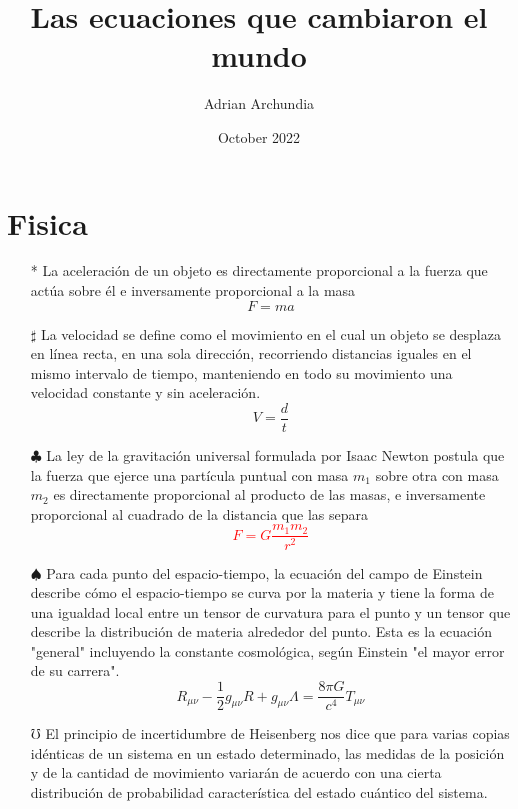\documentclass[4apaper, 12pt]{article}
\title{Las ecuaciones que cambiaron el mundo}
\author{Adrian Archundia }
\date{October 2022}
\begin{document}
\maketitle

\section{Fisica}
\begin{itemize}
    \item [*] La aceleración de un objeto es directamente proporcional a la fuerza que actúa sobre él e inversamente proporcional a la masa
    \begin{equation*}
        F=ma
    \end{equation*}
    \item[$\sharp$]La velocidad se define como el movimiento en el cual un objeto se desplaza en línea recta, en una sola dirección, recorriendo distancias iguales en el mismo intervalo de tiempo, manteniendo en todo su movimiento una velocidad constante y sin aceleración.
    $$V=\frac{d}{t}$$
    
   \item[$\clubsuit$] La ley de la gravitación universal formulada por Isaac Newton postula que la fuerza que ejerce una partícula puntual con masa $m_1$ sobre otra con masa $m_2$ es directamente proporcional al producto de las masas, e inversamente proporcional al cuadrado de la distancia que las separa
    \textcolor{red}{\[F=G\frac{m_1m_2}{r^2}\]}
    
    \item[$\spadesuit$]Para cada punto del espacio-tiempo, la ecuación del campo de Einstein describe cómo el espacio-tiempo se curva por la materia y tiene la forma de una igualdad local entre un tensor de curvatura para el punto y un tensor que describe la distribución de materia alrededor del punto. Esta es la ecuación "general" incluyendo la constante cosmológica, según Einstein "el mayor error de su carrera".
    \begin{equation*}
        R_{\mu\nu}-\frac{1}{2}g_{\mu\nu} R+g_{\mu\nu}\varLambda=\frac{8\pi G}{c^4}T_{\mu\nu}
    \end{equation*}
    
    \item[$\mho$]El principio de incertidumbre de Heisenberg nos dice que para varias copias idénticas de un sistema en un estado determinado, las medidas de la posición y de la cantidad de movimiento variarán de acuerdo con una cierta distribución de probabilidad característica del estado cuántico del sistema.
    

\end{itemize}
\end{document}
